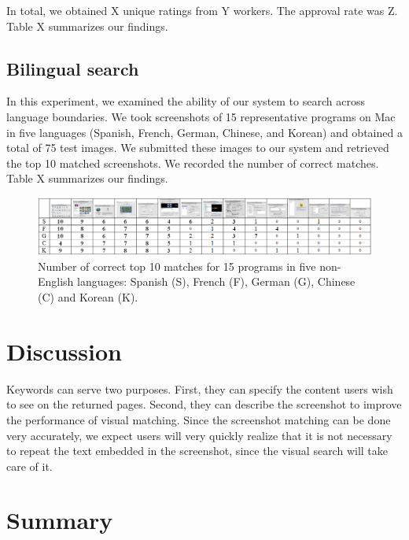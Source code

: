 \documentclass{www2010-submission}
\begin{document}
In total, we obtained X unique ratings from Y workers. The 
approval rate was Z. Table X summarizes our findings. 

\subsection{Bilingual search}

In this experiment, we examined the ability of our system to search
across language boundaries. We took screenshots of 15 representative
programs on Mac in five languages (Spanish, French, German,
Chinese, and Korean) and obtained a total of 75 test
images.  We submitted these images to our 
system and retrieved the top 10 matched screenshots. We recorded
the number of correct matches. Table X summarizes
our findings.

\begin{figure}
\includegraphics[width=2\columnwidth]{figure/bilingual_search.png}
\caption{Number of correct top 10 matches for 15 programs in five non-English
languages: Spanish (S), French (F), German (G), Chinese (C) and Korean (K).}
\end{figure}


\section{Discussion}

Keywords can serve two purposes. First, they can specify the
content users wish to see on the returned pages. Second, they can
describe the screenshot to improve the performance of visual
matching. Since the screenshot matching can be done very
accurately, we expect users will very quickly realize that it is
not necessary to repeat the text embedded in the screenshot, since
the visual search will take care of it.


\section{Summary}



\balancecolumns %
\end{document}
